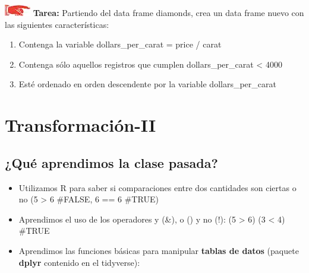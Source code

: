 \documentclass[]{book}
\providecommand{\tightlist}{%
  \setlength{\itemsep}{0pt}\setlength{\parskip}{0pt}}
\theoremstyle{definition}
\theoremstyle{definition}
\theoremstyle{definition}
\theoremstyle{remark}
\begin{document}
\includegraphics{./imagenes/manicule.jpg} \textbf{Tarea:} Partiendo del
data frame diamonds, crea un data frame nuevo con las siguientes
características:

\begin{enumerate}
\def\labelenumi{\arabic{enumi}.}
\item
  Contenga la variable dollars\_per\_carat = price / carat
\item
  Contenga sólo aquellos registros que cumplen dollars\_per\_carat
  \textless{} 4000
\item
  Esté ordenado en orden descendente por la variable dollars\_per\_carat
\end{enumerate}

\chapter{Transformación-II}\label{transformacion-ii}

\section{¿Qué aprendimos la clase
pasada?}\label{que-aprendimos-la-clase-pasada-1}

\begin{itemize}
\tightlist
\item
  Utilizamos R para saber si comparaciones entre dos cantidades son
  ciertas o no (5 \textgreater{} 6 \#FALSE, 6 == 6 \#TRUE)
\item
  Aprendimos el uso de los operadores y (\&), o (\textbar{}) y no (!):
  (5 \textgreater{} 6) \textbar{} (3 \textless{} 4) \#TRUE
\item
  Aprendimos las funciones básicas para manipular \textbf{tablas de
  datos} (paquete \textbf{dplyr} contenido en el tidyverse):
\end{itemize}
\end{document}

